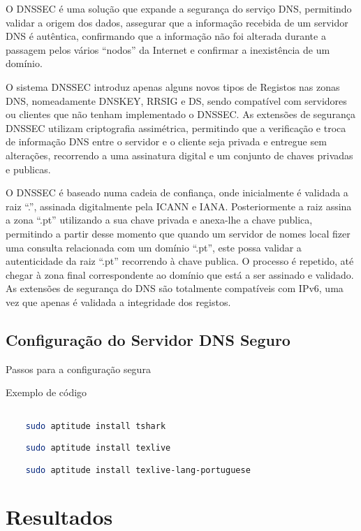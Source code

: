 \documentclass[a4paper]{report} %
\begin{document}
O DNSSEC é uma solução que expande a segurança do serviço DNS, permitindo validar a origem dos dados, assegurar que a informação recebida de um servidor DNS é autêntica, confirmando que a informação não foi alterada durante a passagem pelos vários “nodos” da Internet e confirmar a inexistência de um domínio.

O sistema DNSSEC introduz apenas alguns novos tipos de Registos nas zonas DNS, nomeadamente DNSKEY, RRSIG e DS, sendo compatível com servidores ou clientes que não tenham implementado o DNSSEC. As extensões de segurança DNSSEC utilizam criptografia assimétrica, permitindo que a verificação e troca de informação DNS entre o servidor e o cliente seja privada e entregue sem alterações, recorrendo a uma assinatura digital e um conjunto de chaves privadas e publicas.

O DNSSEC é baseado numa cadeia de confiança, onde inicialmente é validada a raiz “.”, assinada digitalmente pela ICANN e IANA. Posteriormente a raiz assina a zona “.pt” utilizando a sua chave privada e anexa-lhe a chave publica, permitindo a partir desse momento que quando um servidor de nomes local fizer uma consulta relacionada com um domínio “.pt”, este possa validar a autenticidade da raiz “.pt” recorrendo à chave publica. O processo é repetido, até chegar à zona final correspondente ao domínio que está a ser assinado e validado. As extensões de segurança do DNS são totalmente compatíveis com IPv6, uma vez que apenas é validada a integridade dos registos.

\section{Configuração do Servidor DNS Seguro}
\label{sec_config_segura}

Passos para a configuração segura

Exemplo de código
\begin{lstlisting}[language=bash]

	sudo aptitude install tshark

	sudo aptitude install texlive

	sudo aptitude install texlive-lang-portuguese

\end{lstlisting}

\chapter{Resultados}
\end{document}

